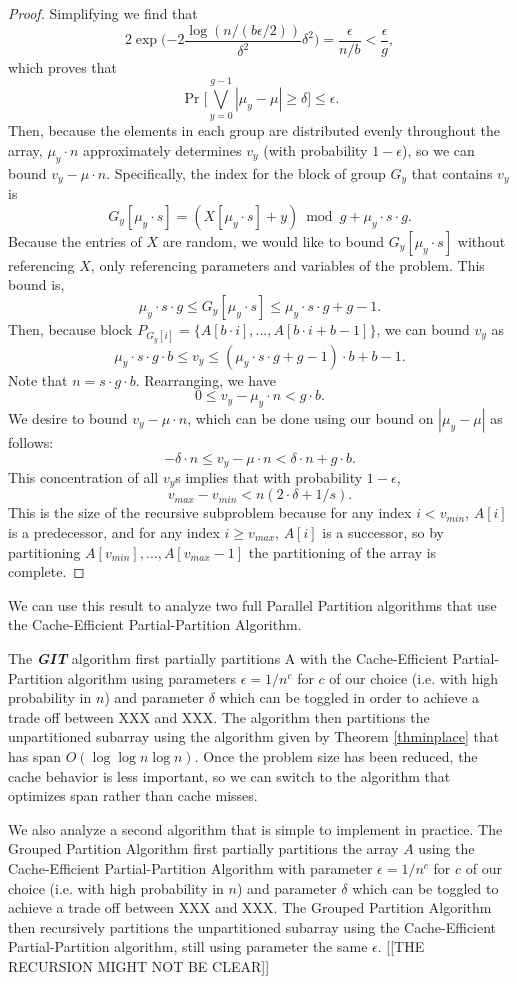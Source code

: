 \documentclass[sigconf]{acmart}
\newcommand{\defn}[1]       {{\textit{\textbf{\boldmath #1}}}}
\theoremstyle{remark}
\theoremstyle{remark}
\begin{document}
\begin{proof}
	Simplifying we find that  
	$$2\exp\Big({-2} \frac{\log (n/(b\epsilon/2))}{\delta^2} \delta^2\Big) = \frac{\epsilon}{n/b} < \frac{\epsilon}{g},$$
	which proves that 
	$$\Pr\Big[\bigvee_{y=0}^{g-1} |\mu_y - \mu| \geq \delta\Big] \leq \epsilon.$$
	Then, because the elements in each group are distributed evenly throughout the array, $\mu_y\cdot n$ approximately determines $v_y$ (with probability $1-\epsilon$), so we can bound $v_y-\mu\cdot n$. 
	Specifically, the index for the block of group $G_y$ that contains $v_y$ is $$G_y[\mu_y\cdot s]= (X[\mu_y \cdot s] + y) \bmod g + \mu_y \cdot s\cdot g.$$
	Because the entries of $X$ are random, we would like to bound $G_y[\mu_y\cdot s]$ without referencing $X$, only referencing parameters and variables of the problem.
	This bound is, 
	$$ \mu_y \cdot s\cdot g \leq G_y[\mu_y\cdot s] \leq  \mu_y \cdot s\cdot g + g-1.$$
	Then, because block $P_{G_y[i]} = \{A[b\cdot i], \ldots, A[b\cdot i + b-1]\}$, we can bound $v_y$ as $$\mu_y\cdot s\cdot g\cdot b \leq v_y \leq (\mu_y \cdot s\cdot g + g-1)\cdot b + b-1.$$
	Note that $n=s\cdot g\cdot b$. 
	Rearranging, we have 
	$$0 \leq v_y- \mu_y\cdot n < g\cdot b.$$
	We desire to bound $v_y-\mu\cdot n$, which can be done using our bound on $|\mu_y - \mu|$ as follows:
	$$ - \delta\cdot n \leq v_y - \mu\cdot n < \delta\cdot n + g\cdot b.$$
	This concentration of all $v_y$s implies that with probability $1-\epsilon$, 
	$$v_{max}-v_{min}<n(2\cdot\delta + 1/s).$$ 
	This is the size of the recursive subproblem because for any index $i < v_{min}$, $A[i]$ is a predecessor, and for any index $i \geq v_{max}$, $A[i]$ is a successor, so by partitioning $A[v_{min}], \ldots, A[v_{max}-1]$ the partitioning of the array is complete.
\end{proof}
We can use this result to analyze two full Parallel Partition algorithms that use the Cache-Efficient Partial-Partition Algorithm.

The \defn{GIT} algorithm first partially partitions A with the Cache-Efficient Partial-Partition algorithm using parameters $\epsilon = 1/n^c$ for $c$ of our choice (i.e. with high probability in $n$) and parameter $\delta $ which can be toggled in order to achieve a trade off between XXX and XXX.
The algorithm then partitions the unpartitioned subarray using the algorithm given by Theorem \ref{thminplace} that has span $O(\log\log n \log n)$.
Once the problem size has been reduced, the cache behavior is less important, so we can switch to the algorithm that optimizes span rather than cache misses.

We also analyze a second algorithm that is simple to implement in practice.
The Grouped Partition Algorithm first partially partitions the array $A$ using the Cache-Efficient Partial-Partition Algorithm with parameter $\epsilon = 1/n^c$ for $c$ of our choice (i.e. with high probability in $n$) and parameter $\delta$ which can be toggled to achieve a trade off between XXX and XXX. 
The Grouped Partition Algorithm then recursively partitions the unpartitioned subarray using the Cache-Efficient Partial-Partition algorithm, still using parameter the same $\epsilon$. [[THE RECURSION MIGHT NOT BE CLEAR]]
\end{document}
